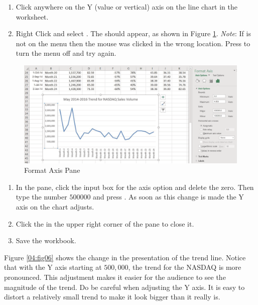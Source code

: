 \begin{enumerate}
	\item Click anywhere on the Y (value or vertical) axis on the  line chart in the  worksheet.
	\item Right Click and select . The  should appear, as shown in Figure \ref{04:fig05}. \textit{Note}: If  is not on the menu then the mouse was clicked in the wrong location. Press  to turn the menu off and try again.
\end{enumerate}

\begin{figure}[H]
	\centering
	\includegraphics[width=\maxwidth{.95\linewidth}]{gfx/ch04_fig05}
	\caption{Format Axis Pane}
	\label{04:fig05}
\end{figure}

\begin{enumerate}[resume]
	\item In the  pane, click the input box for the  axis option and delete the zero. Then type the number $ 500000 $ and press . As soon as this change is made the Y axis on the chart adjusts.
	\item Click the  in the upper right corner of the  pane to close it.
	\item Save the workbook.
\end{enumerate}

Figure \ref{04:fig06} shows the change in the presentation of the trend line. Notice that with the Y axis starting at $ 500,000 $, the trend for the NASDAQ is more pronounced. This adjustment makes it easier for the audience to see the magnitude of the trend. Do be careful when adjusting the Y axis. It is easy to distort a relatively small trend to make it look bigger than it really is.

